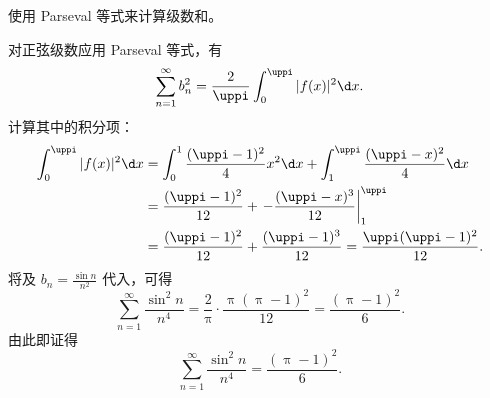 \begin{myproof}
    使用 Parseval 等式来计算级数和。

    对正弦级数应用 Parseval 等式，有
    \begin{equation}\label{eq:parseval-sine}
        \sum_{n=1}^{\infty} b_n^2 = \frac{2}{\uppi} \int_{0}^{\uppi} |f(x)|^2 \d x.
    \end{equation}
    计算其中的积分项：
    \begin{equation}\label{eq:parseval-int}
        \begin{aligned}
            \int_{0}^{\uppi} |f(x)|^2 \d x & = \int_{0}^{1} \frac{(\uppi-1)^2}{4} x^2 \d x + \int_{1}^{\uppi} \frac{(\uppi-x)^2}{4} \d x \\
                                           & = \frac{(\uppi-1)^2}{12} + \left. -\frac{(\uppi-x)^3}{12} \right|_{1}^{\uppi}               \\
                                           & = \frac{(\uppi-1)^2}{12} + \frac{(\uppi-1)^3}{12} = \frac{\uppi(\uppi-1)^2}{12}.
        \end{aligned}
    \end{equation}
    将及 $b_n = \frac{\sin n}{n^2}$ 代入，可得
    \begin{equation}\label{eq:parseval-final}
        \sum_{n=1}^{\infty} \frac{\sin^2 n}{n^4} = \frac{2}{\uppi} \cdot \frac{\uppi(\uppi-1)^2}{12} = \frac{(\uppi-1)^2}{6}.
    \end{equation}
    由此即证得
    \begin{equation}
        \sum_{n=1}^{\infty} \frac{\sin^2 n}{n^4} = \frac{(\uppi-1)^2}{6}.
    \end{equation}
\end{myproof}

\endinput
